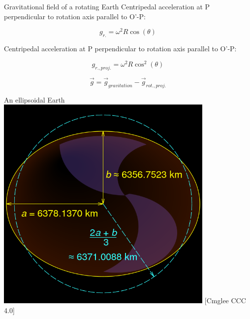 \begin{frame}
\begin{PointSix}{Gravitational field of a rotating Earth}
  \small Centripedal acceleration at P perpendicular to rotation axis parallel to O'-P:

  $$
  g_{r.} = \omega^2 R \cos(\theta)
  $$

  \small Centripedal acceleration at P perpendicular to rotation axis parallel to O'-P:

  $$
  g_{r.,proj.} = \omega^2 R \cos^2(\theta)
  $$

  $$
    \vec{g} = \vec{g}_{gravitation} - \vec{g}_{rot., proj.}
  $$
\end{PointSix}
\end{frame}


\begin{frame}
\begin{PointSix}{An ellipsoidal Earth}
    \includegraphics[width=0.8\textwidth]{Figures/Gravity/Exported/WGS84_mean_Earth_radius_Cmglee_Reversed.png}
    \tiny [Cmglee CCC 4.0]
\end{PointSix}
\end{frame}

